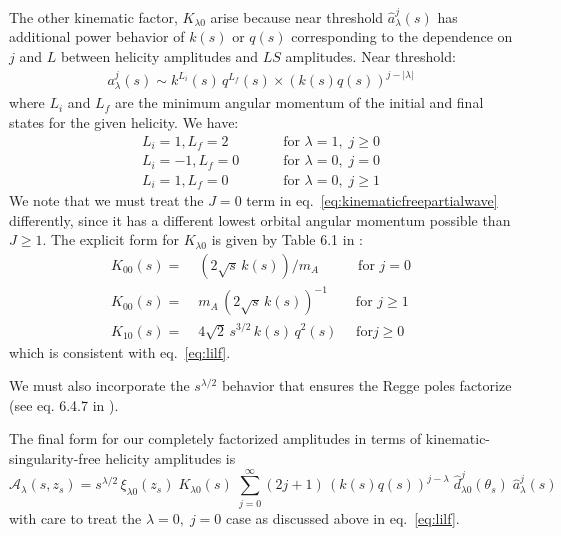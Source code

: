 \documentclass[10pt, aps,prd,amsmath,amssymb,superscriptaddress,onecolumn,
nofootinbib,showpacs,preprintnumbers]{revtex4-1}
\begin{document}
The other kinematic factor, \(K_{\lambda0}\) arise  because near threshold \(\hat{a}_\lambda^j(s)\) has additional power behavior of \(k(s)\) or \(q(s)\) corresponding to the dependence on \(j\) and \(L\) between helicity amplitudes and \(LS\) amplitudes. Near threshold:
  \begin{gather}
    a^j_\lambda(s) \sim k^{L_i}(s) \, q^{L_f}(s) \times (k(s)q(s))^{j- |\lambda|}
  \end{gather}
where \(L_i\) and \(L_f\) are the minimum angular momentum of the initial and final states for the given helicity. We have:
  \begin{align}
      L_i = 1 , L_f = 2& \qquad  \text{ for } \lambda = 1, \; j \geq 0 \nonumber \\
      L_i = -1, L_f = 0 &\qquad  \text{ for } \lambda = 0, \; j = 0  \label{eq:lilf} \\
      L_i = 1, L_f = 0 &\qquad  \text{ for } \lambda = 0, \;  j  \geq 1 \nonumber
  \end{align}
We note that we must treat the \(J=0\) term in eq.~\ref{eq:kinematicfreepartialwave} differently, since it has a different lowest orbital angular momentum possible than \(J\geq 1\). The explicit form for \(K_{\lambda0}\) is given by Table 6.1 in \cite{Collins}:
  \begin{align}
    \label{eq:k-factor}
    K_{00}(s) =& \;  ( 2\sqrt{s} \, k(s))/m_A \qquad \; \, \text{  for } j=0 \nonumber \\
    K_{00 }(s) =& \; m_A \, ( 2\sqrt{s} \, k(s))^{-1} \qquad \text{for } j\geq 1\\ \nonumber
    K_{10}(s) =& \; 4 \sqrt{2} \,  s^{3/2} \, k(s) \, q^2(s)  \quad \text{ for} j\geq 0
  \end{align}
which is consistent with eq.~\ref{eq:lilf}.

We must also incorporate the \(s^{\lambda/2}\) behavior that ensures the Regge poles factorize (see eq. 6.4.7 in \cite{Collins}).

The final form for our completely factorized amplitudes in terms of kinematic-singularity-free helicity amplitudes is
  \begin{equation}
    \mathcal{A}_\lambda(s,z_s) = s^{\lambda/2} \, \xi_{\lambda0}(z_s) \; K_{\lambda0}(s) \; \sum_{j=0}^\infty (2j+1) \, (k(s)q(s))^{j-\lambda} \; \hat{d}^j_{\lambda0}(\theta_s) \; \hat{a}^j_\lambda(s)
  \end{equation}
with care to treat the \(\lambda =0, \;  j=0\) case as discussed above in eq.~\ref{eq:lilf}.
\end{document}
